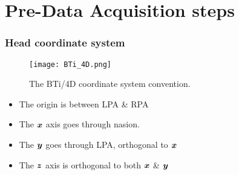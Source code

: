 \section{Pre-Data Acquisition steps}
\begin{frame}
	\frametitle{Head coordinate system}
	\begin{figure}[hbt!]
		\centering
		\texttt{[image: BTi\_4D.png]}
		\caption{The BTi/4D coordinate system convention.} 	
	\end{figure}
\begin{itemize}
	\item The origin is between LPA \& RPA
	\item The $\bm{x}$ axis goes through nasion.
	\item The $\bm{y}$ goes through LPA, orthogonal to $\bm{x}$
	\item The $\bm{z}$ axis is orthogonal to both $\bm{x}$ \& $\bm{y}$
\end{itemize}
\end{frame}
